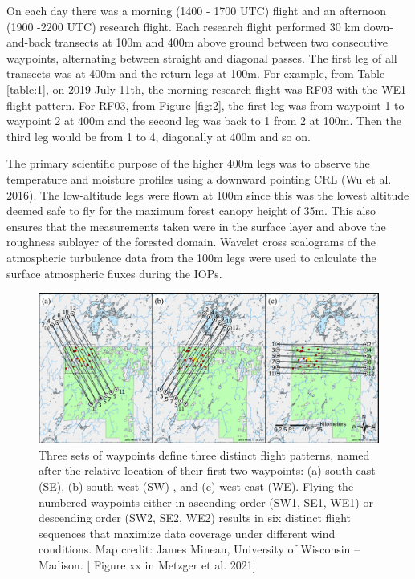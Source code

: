 \documentclass[draft]{agujournal2019}
\begin{document}
On each day there was a morning (1400 - 1700 UTC) flight and an afternoon (1900 -2200 UTC) research flight.  Each research flight performed 30 km down-and-back transects  at 100m and 400m above ground between two consecutive waypoints, alternating between straight and diagonal passes. The first leg of all transects was at 400m and the return legs at 100m. For example, from Table \ref{table:1}, on 2019 July 11th, the morning research flight was RF03 with the WE1 flight pattern. For RF03, from Figure \ref{fig:2},  the first leg was from waypoint 1 to waypoint 2 at 400m and the second leg was back to 1 from 2 at 100m. Then the third leg would be from 1 to 4, diagonally at 400m and so on. 

The primary scientific purpose of the higher 400m legs was to observe the temperature and moisture profiles using a downward pointing CRL (Wu et al. 2016). The low-altitude legs were flown at 100m since this was the  lowest altitude deemed safe to fly for the maximum forest canopy height of 35m. This also ensures that the measurements taken were in the surface layer and above the roughness sublayer of the forested domain. Wavelet cross scalograms of the atmospheric turbulence data from the 100m legs were used to calculate the surface atmospheric fluxes during the IOPs. 

\begin{figure}
 \noindent\includegraphics[width=\textwidth]{way_points.png}
\caption{Three sets of waypoints define three distinct flight patterns, named after the relative location of their first two waypoints: (a) south-east (SE), (b) south-west (SW)  , and (c) west-east (WE). Flying the numbered waypoints either in ascending order (SW1, SE1, WE1) or descending order (SW2, SE2, WE2) results in six distinct flight sequences that maximize data coverage under different wind conditions. Map credit: James Mineau, University of Wisconsin – Madison. [ Figure xx in Metzger et al. 2021]}
\label{fig:way_points}
\end{figure}
\end{document}
